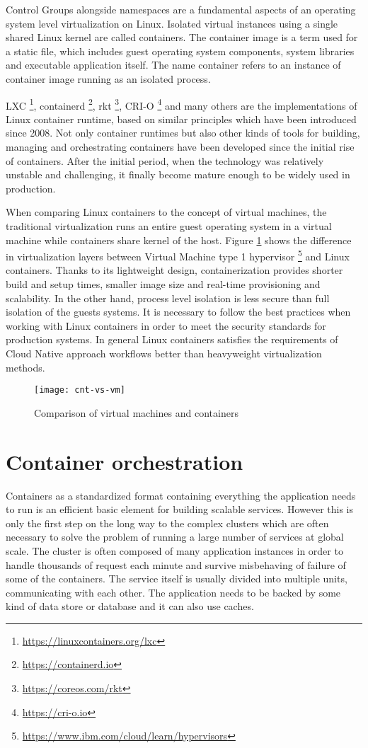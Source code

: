\documentclass[
  digital, %
  twoside, %
  table,   %
  lof,     %
  lot,     %
]{fithesis3}
\begin{document}
Control Groups alongside namespaces are a fundamental aspects of an operating system level virtualization on Linux. Isolated virtual instances using a single shared Linux kernel are called containers. The container image is a term used for a static file, which includes guest operating system components, system libraries and executable application itself. The name container refers to an instance of container image running as an isolated process.

LXC \footnote{\url{https://linuxcontainers.org/lxc}}, containerd \footnote{\url{https://containerd.io}}, rkt \footnote{\url{https://coreos.com/rkt}}, CRI-O \footnote{\url{https://cri-o.io}} and many others are the implementations of Linux container runtime, based on similar principles which have been introduced since 2008. Not only container runtimes but also other kinds of tools for building, managing and orchestrating containers have been developed since the initial rise of containers. After the initial period, when the technology was relatively unstable and challenging, it finally become mature enough to be widely used in production.

When comparing Linux containers to the concept of virtual machines, the traditional virtualization runs an entire guest operating system in a virtual machine while containers share kernel of the host. Figure \ref{fig:cnt-vs-vm} shows the difference in virtualization layers between Virtual Machine type 1 hypervisor \footnote{\url{https://www.ibm.com/cloud/learn/hypervisors}} and Linux containers. Thanks to its lightweight design, containerization provides shorter build and setup times, smaller image size and real-time provisioning and scalability. In the other hand, process level isolation is less secure than full isolation of the guests systems. It is necessary to follow the best practices when working with Linux containers in order to meet the security standards for production systems. In general Linux containers satisfies the requirements of Cloud Native approach workflows better than heavyweight virtualization methods.

\begin{figure}[H]
\caption{Comparison of virtual machines and containers}
\centering
\texttt{[image: cnt-vs-vm]}
\label{fig:cnt-vs-vm}
\end{figure}

\section{Container orchestration} \label{sec:orchestration}
Containers as a standardized format containing everything the application needs to run is an efficient basic element for building scalable services. However this is only the first step on the long way to the complex clusters which are often necessary to solve the problem of running a large number of services at global scale. The cluster is often composed of many application instances in order to handle thousands of request each minute and survive misbehaving of failure of some of the containers. The service itself is usually divided into multiple units, communicating with each other. The application needs to be backed by some kind of data store or database and it can also use caches.
\end{document}
